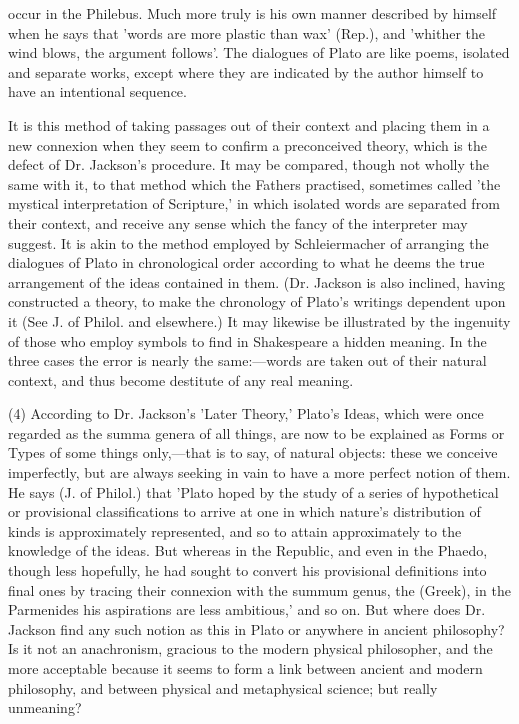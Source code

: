 \documentclass[11pt,letter]{article}
\begin{document}
occur in the Philebus. Much more truly is his own manner described by himself when he says that 'words are more plastic than wax' (Rep.), and 'whither the wind blows, the argument follows'. The dialogues of Plato are like poems, isolated and separate works, except where they are indicated by the author himself to have an intentional sequence.

\par  It is this method of taking passages out of their context and placing them in a new connexion when they seem to confirm a preconceived theory, which is the defect of Dr. Jackson's procedure. It may be compared, though not wholly the same with it, to that method which the Fathers practised, sometimes called 'the mystical interpretation of Scripture,' in which isolated words are separated from their context, and receive any sense which the fancy of the interpreter may suggest. It is akin to the method employed by Schleiermacher of arranging the dialogues of Plato in chronological order according to what he deems the true arrangement of the ideas contained in them. (Dr. Jackson is also inclined, having constructed a theory, to make the chronology of Plato's writings dependent upon it (See J. of Philol. and elsewhere.) It may likewise be illustrated by the ingenuity of those who employ symbols to find in Shakespeare a hidden meaning. In the three cases the error is nearly the same:—words are taken out of their natural context, and thus become destitute of any real meaning.

\par  (4) According to Dr. Jackson's 'Later Theory,' Plato's Ideas, which were once regarded as the summa genera of all things, are now to be explained as Forms or Types of some things only,—that is to say, of natural objects: these we conceive imperfectly, but are always seeking in vain to have a more perfect notion of them. He says (J. of Philol.) that 'Plato hoped by the study of a series of hypothetical or provisional classifications to arrive at one in which nature's distribution of kinds is approximately represented, and so to attain approximately to the knowledge of the ideas. But whereas in the Republic, and even in the Phaedo, though less hopefully, he had sought to convert his provisional definitions into final ones by tracing their connexion with the summum genus, the (Greek), in the Parmenides his aspirations are less ambitious,' and so on. But where does Dr. Jackson find any such notion as this in Plato or anywhere in ancient philosophy? Is it not an anachronism, gracious to the modern physical philosopher, and the more acceptable because it seems to form a link between ancient and modern philosophy, and between physical and metaphysical science; but really unmeaning?
\end{document}
